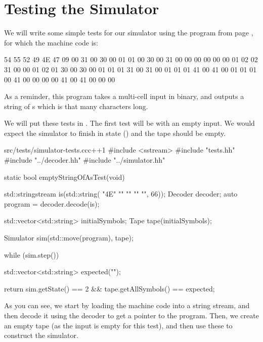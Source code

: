 \section{Testing the Simulator}
We will write some simple tests for our simulator using the program from page \pageref{program:simpleTest}, for which the machine code is:
\begin{stdout}
54 55 52 49 4E 47 09 00 31 00 30 00 01 01 00 30 00 31 00 00 00 00 00 00 01 02 02 31 00 00 01 02 01 30 00 30 00 01 01 01 31 00 31 00 01 01 01 41 00 41 00 01 01 01 00 41 00 00 00 00 41 00 41 00 00 00
\end{stdout}
As a reminder, this program takes a multi-cell input in binary, and outputs a string of s which is that many characters long.

We will put these tests in . The first test will be with an empty input. We would expect the simulator to finish in state  () and the tape should be empty.

\begin{file}{src/tests/simulator-tests.cc}{c++}{1}
#include <sstream>
#include "tests.hh"
#include "../decoder.hh"
#include "../simulator.hh"

static bool emptyStringOfAsTest(void)
{
    std::stringstream is(std::string(
        "\x4E"
        ""
        ""
        ""
        "",
        66));
    Decoder decoder;
    auto program = decoder.decode(is);

    std::vector<std::string> initialSymbols;
    Tape tape(initialSymbols);

    Simulator sim(std::move(program), tape);

    while (sim.step())
    {
    }

    std::vector<std::string> expected({""});

    return sim.getState() == 2 && tape.getAllSymbols() == expected;
}
\end{file}

As you can see, we start by loading the machine code into a string stream, and then decode it using the decoder to get a pointer to the program. Then, we create an empty tape (as the input is empty for this test), and then use these to construct the simulator.

